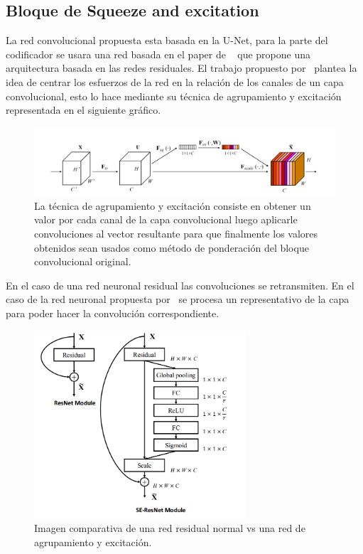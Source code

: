 \subsection{Bloque de Squeeze and excitation}
La red convolucional propuesta esta basada en la U-Net, para la parte del codificador se usara una red  basada en el paper de ~\cite{Hu2017} que propone una arquitectura basada en las redes residuales. 
El trabajo propuesto por~\cite{Hu2017} plantea la idea de centrar los esfuerzos de la red en la relación de los canales de un capa convolucional, esto lo hace mediante su técnica de agrupamiento y excitación representada en el siguiente gráfico.
\begin{figure}[H]
	\centering
		\includegraphics[width=1\textwidth]{06changedetection/SenetBlock.png} 

	\caption[Técnica de agrupamiento y excitación de las SE-Net]{La técnica de agrupamiento y excitación consiste en obtener un valor por cada canal de la capa convolucional luego aplicarle convoluciones al vector resultante para que finalmente los valores obtenidos sean usados como método de  ponderación del bloque convolucional original.}
	\label{fig:Senett}
\end{figure}
En el caso de una red neuronal residual las convoluciones se retransmiten. En el caso de la red neuronal propuesta por~\cite{Hu2017} se procesa un representativo de la capa para poder hacer la convolución correspondiente.

\begin{figure}[H]
	\centering
		\includegraphics[width=0.7\textwidth]{06changedetection/senet_resnet.png} 
	\caption[Comparación ResNet y Se-Resnet]{Imagen comparativa de una red residual normal vs una red de agrupamiento y excitación.}
	\label{fig:Senett}
\end{figure}


